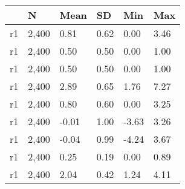 \begin{table}[htbp]
\begin{tabular}{|l|l|l|l|l|l|}\hline  
 & N  & Mean  & SD  & Min  & Max  \\ \hline  
r1 &     2,400 &      0.81 &      0.62 &      0.00 &      3.46 \\ \hline 
r1 &     2,400 &      0.50 &      0.50 &      0.00 &      1.00 \\ \hline 
r1 &     2,400 &      0.50 &      0.50 &      0.00 &      1.00 \\ \hline 
r1 &     2,400 &      2.89 &      0.65 &      1.76 &      7.27 \\ \hline 
r1 &     2,400 &      0.80 &      0.60 &      0.00 &      3.25 \\ \hline 
r1 &     2,400 &     -0.01 &      1.00 &     -3.63 &      3.26 \\ \hline 
r1 &     2,400 &     -0.04 &      0.99 &     -4.24 &      3.67 \\ \hline 
r1 &     2,400 &      0.25 &      0.19 &      0.00 &      0.89 \\ \hline 
r1 &     2,400 &      2.04 &      0.42 &      1.24 &      4.11 \\ \hline 
  \end{tabular}
\end{table}
